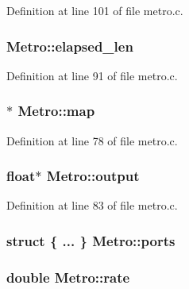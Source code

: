 Definition at line 101 of file metro.\+c.

\subsubsection[{\texorpdfstring{elapsed\+\_\+len}{elapsed_len}}]{ Metro\+::elapsed\+\_\+len}\hypertarget{struct_metro_a40198227cd12fb39b20c97eed3ec2f89}{}\label{struct_metro_a40198227cd12fb39b20c97eed3ec2f89}


Definition at line 91 of file metro.\+c.

\subsubsection[{\texorpdfstring{map}{map}}]{$\ast$ Metro\+::map}\hypertarget{struct_metro_a9634657834ec815571a001ec39d199ea}{}\label{struct_metro_a9634657834ec815571a001ec39d199ea}


Definition at line 78 of file metro.\+c.

\subsubsection[{\texorpdfstring{output}{output}}]{\setlength{\rightskip}{0pt plus 5cm}float$\ast$ Metro\+::output}\hypertarget{struct_metro_aa7a60a05020740815537be1a2684788f}{}\label{struct_metro_aa7a60a05020740815537be1a2684788f}


Definition at line 83 of file metro.\+c.

\subsubsection[{\texorpdfstring{ports}{ports}}]{\setlength{\rightskip}{0pt plus 5cm}struct \{ ... \}   Metro\+::ports}\hypertarget{struct_metro_aee87e33543837a45e1125cf3ed2cbc9c}{}\label{struct_metro_aee87e33543837a45e1125cf3ed2cbc9c}
\subsubsection[{\texorpdfstring{rate}{rate}}]{\setlength{\rightskip}{0pt plus 5cm}double Metro\+::rate}\hypertarget{struct_metro_a8357844df6655d12ff781a3549e45dce}{}\label{struct_metro_a8357844df6655d12ff781a3549e45dce}


